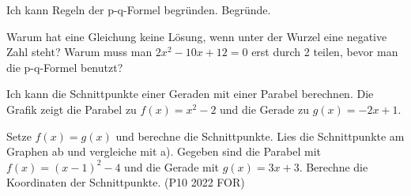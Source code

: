 \begin{aufgabe}{Ich kann Regeln der p-q-Formel begründen.}
Begründe.
\begin{teile}
\teil Warum hat eine Gleichung keine Lösung, wenn unter der Wurzel eine negative Zahl steht?
\teil Warum muss man $2x^2 - 10x + 12 = 0$ erst durch 2 teilen, bevor man die p-q-Formel benutzt?
\end{teile}
\end{aufgabe}

\begin{aufgabe}{Ich kann die Schnittpunkte einer Geraden mit einer Parabel berechnen.}
Die Grafik zeigt die Parabel zu $f(x) = x^2 - 2$ und die Gerade zu $g(x) = -2x + 1$.

\begin{ksys}[xmin=-4,xmax=3,ymin=-3,ymax=8,ablesen]
\end{ksys}

\begin{teile}
\teil Setze $f(x) = g(x)$ und berechne die Schnittpunkte. \hfill {} \quad {}
\teil Lies die Schnittpunkte am Graphen ab und vergleiche mit a).
\teil Gegeben sind die Parabel mit $f(x) = (x - 1)^2 - 4$ und die Gerade mit $g(x) = 3x + 3$. Berechne die Koordinaten der Schnittpunkte. (P10 2022 FOR) \hfill {} \quad {}
\end{teile}
\end{aufgabe}
